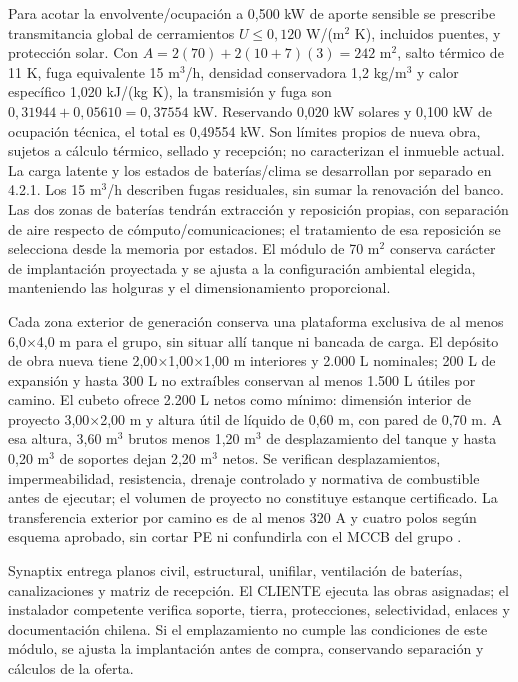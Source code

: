 Para acotar la envolvente/ocupación a 0,500 kW de aporte sensible se prescribe transmitancia global de cerramientos $U\leq0,120$ W/(m$^2$ K), incluidos puentes, y protección solar. Con $A=2(70)+2(10+7)(3)=242$ m$^2$, salto térmico de 11 K, fuga equivalente 15 m$^3$/h, densidad conservadora 1,2 kg/m$^3$ y calor específico 1,020 kJ/(kg K), la transmisión y fuga son $0,31944+0,05610=0,37554$ kW. Reservando 0,020 kW solares y 0,100 kW de ocupación técnica, el total es 0,49554 kW. Son límites propios de nueva obra, sujetos a cálculo térmico, sellado y recepción; no caracterizan el inmueble actual. La carga latente y los estados de baterías/clima se desarrollan por separado en 4.2.1. Los 15 m$^3$/h describen fugas residuales, sin sumar la renovación del banco. Las dos zonas de baterías tendrán extracción y reposición propias, con separación de aire respecto de cómputo/comunicaciones; el tratamiento de esa reposición se selecciona desde la memoria por estados. El módulo de 70 m$^2$ conserva carácter de implantación proyectada y se ajusta a la configuración ambiental elegida, manteniendo las holguras y el dimensionamiento proporcional.

Cada zona exterior de generación conserva una plataforma exclusiva de al menos 6,0$\times$4,0 m para el grupo, sin situar allí tanque ni bancada de carga. El depósito de obra nueva tiene 2,00$\times$1,00$\times$1,00 m interiores y 2.000 L nominales; 200 L de expansión y hasta 300 L no extraíbles conservan al menos 1.500 L útiles por camino. El cubeto ofrece 2.200 L netos como mínimo: dimensión interior de proyecto 3,00$\times$2,00 m y altura útil de líquido de 0,60 m, con pared de 0,70 m. A esa altura, 3,60 m$^3$ brutos menos 1,20 m$^3$ de desplazamiento del tanque y hasta 0,20 m$^3$ de soportes dejan 2,20 m$^3$ netos. Se verifican desplazamientos, impermeabilidad, resistencia, drenaje controlado y normativa de combustible antes de ejecutar; el volumen de proyecto no constituye estanque certificado. La transferencia exterior por camino es de al menos 320 A y cuatro polos según esquema aprobado, sin cortar PE ni confundirla con el MCCB del grupo \parencites{p7-eaton-93t-guia}{p7-fg-p200-ficha}.



Synaptix entrega planos civil, estructural, unifilar, ventilación de baterías, canalizaciones y matriz de recepción. El CLIENTE ejecuta las obras asignadas; el instalador competente verifica soporte, tierra, protecciones, selectividad, enlaces y documentación chilena. Si el emplazamiento no cumple las condiciones de este módulo, se ajusta la implantación antes de compra, conservando separación y cálculos de la oferta.

